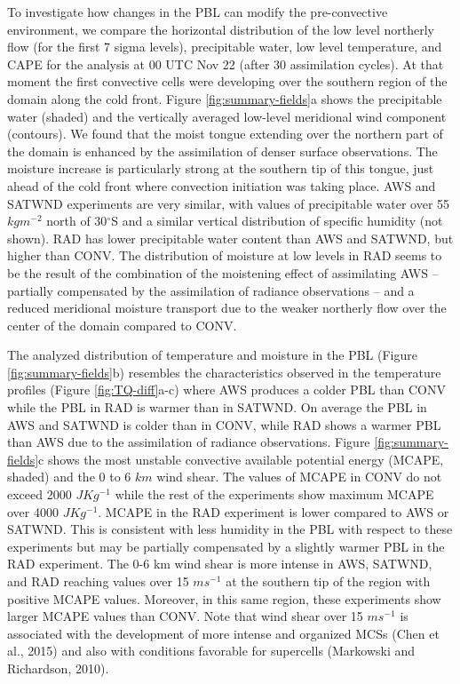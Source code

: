 \documentclass[final,5p,times,twocolumn,authoryear]{elsarticle} %
\begin{document}
To investigate how changes in the PBL can modify the pre-convective environment, we compare the horizontal distribution of the low level northerly flow (for the first 7 sigma levels), precipitable water, low level temperature, and CAPE for the analysis at 00 UTC Nov 22 (after 30 assimilation cycles). At that moment the first convective cells were developing over the southern region of the domain along the cold front. Figure \ref{fig:summary-fields}a shows the precipitable water (shaded) and the vertically averaged low-level meridional wind component (contours). We found that the moist tongue extending over the northern part of the domain is enhanced by the assimilation of denser surface observations. The moisture increase is particularly strong at the southern tip of this tongue, just ahead of the cold front where convection initiation was taking place. AWS and SATWND experiments are very similar, with values of precipitable water over 55 \(kgm^{-2}\) north of 30\(^{\circ}\)S and a similar vertical distribution of specific humidity (not shown). RAD has lower precipitable water content than AWS and SATWND, but higher than CONV. The distribution of moisture at low levels in RAD seems to be the result of the combination of the moistening effect of assimilating AWS -- partially compensated by the assimilation of radiance observations -- and a reduced meridional moisture transport due to the weaker northerly flow over the center of the domain compared to CONV.

The analyzed distribution of temperature and moisture in the PBL (Figure \ref{fig:summary-fields}b) resembles the characteristics observed in the temperature profiles (Figure \ref{fig:TQ-diff}a-c) where AWS produces a colder PBL than CONV while the PBL in RAD is warmer than in SATWND. On average the PBL in AWS and SATWND is colder than in CONV, while RAD shows a warmer PBL than AWS due to the assimilation of radiance observations. Figure \ref{fig:summary-fields}c shows the most unstable convective available potential energy (MCAPE, shaded) and the 0 to 6 \(km\) wind shear. The values of MCAPE in CONV do not exceed 2000 \(JKg^{-1}\) while the rest of the experiments show maximum MCAPE over 4000 \(JKg^{-1}\). MCAPE in the RAD experiment is lower compared to AWS or SATWND. This is consistent with less humidity in the PBL with respect to these experiments but may be partially compensated by a slightly warmer PBL in the RAD experiment. The 0-6 km wind shear is more intense in AWS, SATWND, and RAD reaching values over 15 \(ms^{-1}\) at the southern tip of the region with positive MCAPE values. Moreover, in this same region, these experiments show larger MCAPE values than CONV. Note that wind shear over 15 \(ms^{-1}\) is associated with the development of more intense and organized MCSs (Chen et al., 2015) and also with conditions favorable for supercells (Markowski and Richardson, 2010).
\end{document}
